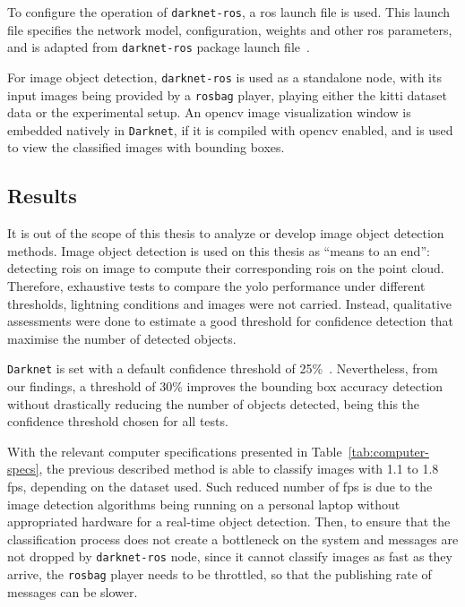 To configure the operation of \texttt{darknet-ros}, a \ac{ros} launch file is used. This launch file specifies the network model, configuration, weights and other \ac{ros} parameters, and is adapted from \texttt{darknet-ros} package launch file~\cite{MarkoBjelonic}. 

For image object detection, \texttt{darknet-ros} is used as a standalone node, with its input images being provided by a \texttt{rosbag} player, playing either the \ac{kitti} dataset data or the experimental setup. An \ac{opencv} image visualization window is embedded natively in \texttt{Darknet}, if it is compiled with \ac{opencv} enabled, and is used to view the classified images with bounding boxes.


\subsection{Results}
\label{subsec:object-detection:image-results}
It is out of the scope of this thesis to analyze or develop image object detection methods. Image object detection is used on this thesis as ``means to an end'': detecting \acp{roi} on image to compute their corresponding \acp{roi} on the point cloud. Therefore, exhaustive tests to compare the \ac{yolo} performance under different thresholds, lightning conditions and images were not carried. Instead, qualitative assessments were done to estimate a good threshold for confidence detection that maximise the number of detected objects.

\texttt{Darknet} is set with a default confidence threshold of 25\%~\cite{Redmon2016}. Nevertheless, from our findings, a threshold of 30\% improves the bounding box accuracy detection without drastically reducing the number of objects detected, being this the confidence threshold chosen for all tests.

With the relevant computer specifications presented in Table~\ref{tab:computer-specs}, the previous described method is able to classify images with 1.1 to 1.8 \ac{fps}, depending on the dataset used. Such reduced number of \ac{fps} is due to the image detection algorithms being running on a personal laptop without appropriated hardware for a real-time object detection. Then, to ensure that the classification process does not create a bottleneck on the system and messages are not dropped by \texttt{darknet-ros} node, since it cannot classify images as fast as they arrive, the \texttt{rosbag} player needs to be throttled, so that the publishing rate of messages can be slower.

